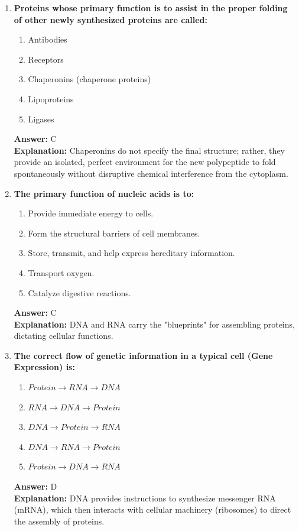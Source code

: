 \documentclass[11pt, a4paper]{article}
\begin{document}
\begin{enumerate}
\item \textbf{Proteins whose primary function is to assist in the proper folding of other newly synthesized proteins are called:}
\begin{enumerate}[label=\Alph*.]
    \item Antibodies
    \item Receptors
    \item Chaperonins (chaperone proteins)
    \item Lipoproteins
    \item Ligases
\end{enumerate}
\textbf{Answer:} C \\
\textbf{Explanation:} Chaperonins do not specify the final structure; rather, they provide an isolated, perfect environment for the new polypeptide to fold spontaneously without disruptive chemical interference from the cytoplasm.


\item \textbf{The primary function of nucleic acids is to:}
\begin{enumerate}[label=\Alph*.]
    \item Provide immediate energy to cells.
    \item Form the structural barriers of cell membranes.
    \item Store, transmit, and help express hereditary information.
    \item Transport oxygen.
    \item Catalyze digestive reactions.
\end{enumerate}
\textbf{Answer:} C \\
\textbf{Explanation:} DNA and RNA carry the "blueprints" for assembling proteins, dictating cellular functions.

\item \textbf{The correct flow of genetic information in a typical cell (Gene Expression) is:}
\begin{enumerate}[label=\Alph*.]
    \item $Protein \rightarrow RNA \rightarrow DNA$
    \item $RNA \rightarrow DNA \rightarrow Protein$
    \item $DNA \rightarrow Protein \rightarrow RNA$
    \item $DNA \rightarrow RNA \rightarrow Protein$
    \item $Protein \rightarrow DNA \rightarrow RNA$
\end{enumerate}
\textbf{Answer:} D \\
\textbf{Explanation:} DNA provides instructions to synthesize messenger RNA (mRNA), which then interacts with cellular machinery (ribosomes) to direct the assembly of proteins.


\end{enumerate}
\end{document}
